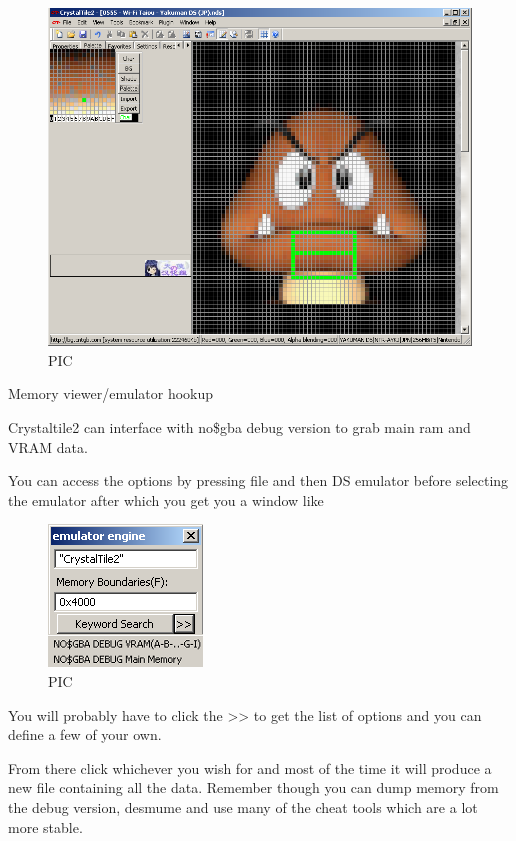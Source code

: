\documentclass[
]{book}
\begin{document}
\begin{figure}
\centering
\includegraphics{images/225_home_fast6191_romhackingguide_unrenamed_fil___inal_borders_romhackguidecrystaltile2usage6.png}
\caption{PIC}
\end{figure}

Memory viewer/emulator hookup

Crystaltile2 can interface with no\$gba debug version to grab main ram and VRAM data.

You can access the options by pressing file and then DS emulator before selecting the emulator after which you get you a window like

\begin{figure}
\centering
\includegraphics{images/226_home_fast6191_romhackingguide_unrenamed_fil___inal_borders_romhackguidecrystaltile2usage7.png}
\caption{PIC}
\end{figure}

You will probably have to click the \textgreater﻿\textgreater{} to get the list of options and you can define a few of your own.

From there click whichever you wish for and most of the time it will produce a new file containing all the data. Remember though you can dump memory from the debug version, desmume and use many of the cheat tools which are a lot more stable.
\end{document}
